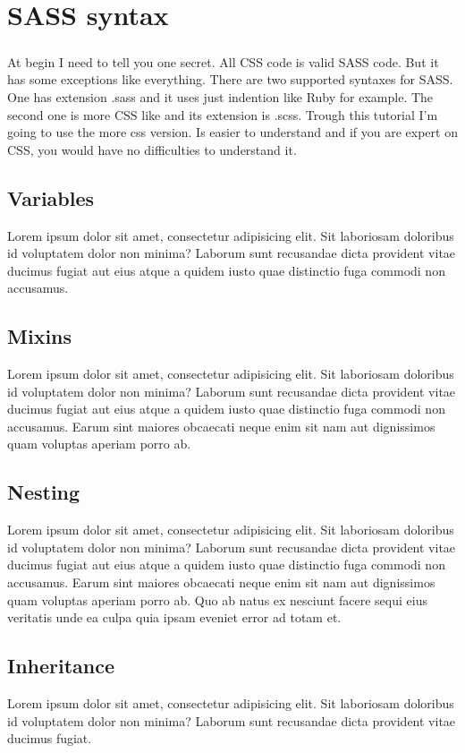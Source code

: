 \chapter{SASS syntax}
\paragraph{}
At begin I need to tell you one secret. All CSS code is valid SASS code. But it has some exceptions like everything. 
There are two supported syntaxes for SASS. One has extension .sass and it uses just indention like Ruby for example. The second one is more CSS like and its extension is .scss. Trough this tutorial I'm going to use the more css version. Is easier to understand and if you are expert on CSS, you would have no difficulties to understand it.

\section{Variables}
Lorem ipsum dolor sit amet, consectetur adipisicing elit. Sit laboriosam doloribus id voluptatem dolor non minima? Laborum sunt recusandae dicta provident vitae ducimus fugiat aut eius atque a quidem iusto quae distinctio fuga commodi non accusamus.

\section{Mixins}
Lorem ipsum dolor sit amet, consectetur adipisicing elit. Sit laboriosam doloribus id voluptatem dolor non minima? Laborum sunt recusandae dicta provident vitae ducimus fugiat aut eius atque a quidem iusto quae distinctio fuga commodi non accusamus. Earum sint maiores obcaecati neque enim sit nam aut dignissimos quam voluptas aperiam porro ab.

\section{Nesting}
Lorem ipsum dolor sit amet, consectetur adipisicing elit. Sit laboriosam doloribus id voluptatem dolor non minima? Laborum sunt recusandae dicta provident vitae ducimus fugiat aut eius atque a quidem iusto quae distinctio fuga commodi non accusamus. Earum sint maiores obcaecati neque enim sit nam aut dignissimos quam voluptas aperiam porro ab. Quo ab natus ex nesciunt facere sequi eius veritatis unde ea culpa quia ipsam eveniet error ad totam et.

\section{Inheritance}
Lorem ipsum dolor sit amet, consectetur adipisicing elit. Sit laboriosam doloribus id voluptatem dolor non minima? Laborum sunt recusandae dicta provident vitae ducimus fugiat.